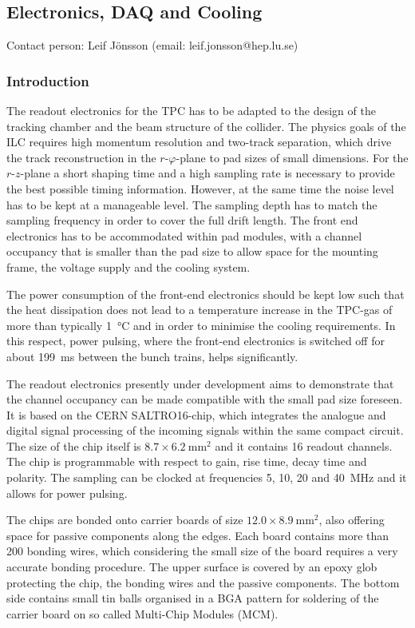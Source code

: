 \subsection{Electronics, DAQ and Cooling}\label{chap:TPC_sec:electronics}
Contact person: Leif J{\"o}nsson (email: leif.jonsson@hep.lu.se)\\

\subsubsection{Introduction}
The readout electronics for the TPC has to be adapted to the design of the tracking chamber and the beam structure of the collider. The physics goals of the ILC requires high momentum resolution and two-track separation, which drive the track reconstruction in the $r\text{-}\varphi$-plane to pad sizes of small dimensions. For the $r\text{-}z$-plane a short shaping time and a high sampling rate is necessary to provide the best possible timing information. However, at the same time the noise level has to be kept at a manageable level. The sampling depth has to match the sampling frequency in order to cover the full drift length. The front end electronics has to be accommodated within pad modules, with a channel occupancy that is smaller than the pad size to allow space for the mounting frame, the voltage supply and the cooling system.

The power consumption of the front-end electronics should be kept low such that the heat dissipation does not lead to a temperature increase in the TPC-gas of more than typically \SI{1}{\celsius} and in order to minimise the cooling requirements. In this respect, power pulsing, where the front-end electronics is switched off for about \SI{199}{\milli\second} between the bunch trains, helps significantly.

The readout electronics presently under development aims to demonstrate that the channel occupancy can be made compatible with the small pad size foreseen. It is based on the CERN SALTRO16-chip, which integrates the analogue and digital signal processing of the incoming signals within the same compact circuit. The size of the chip itself is $8.7 \times \SI{6.2}{\milli\meter\squared}$ and it contains 16 readout channels. The chip is programmable with respect to gain, rise time, decay time and polarity. The sampling can be clocked at frequencies 5, 10, 20 and \SI{40}{\MHz} and it allows for power pulsing.

\noindent The chips are bonded onto carrier boards of size $12.0 \times \SI{8.9}{\milli\meter\squared}$, also offering space for passive components along the edges. Each board contains more than 200 bonding wires, which considering the small size of the board requires a very accurate bonding procedure. The upper surface is covered by an epoxy glob protecting the chip, the bonding wires and the passive components. The bottom side contains small tin balls organised in a BGA pattern for soldering of the carrier board on so called Multi-Chip Modules (MCM).


